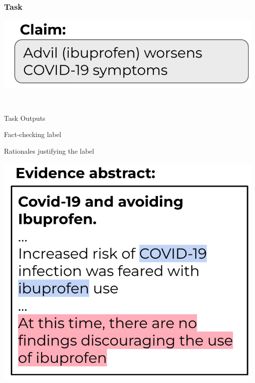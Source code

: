 \documentclass[13.5pt,aspecratio=169, xcolor=dvipsnames]{beamer}
\begin{document}


\begin{frame}
    \onehalfspacing
    \frametitle{Task}
    \begin{minipage}{0.47\textwidth}
        \includegraphics[width=\textwidth]{Claim.png}
         {
            \centering
            \begin{minipage}{0.7\textwidth}
            {
            \begin{block}{}
                \begin{center}
                    \textbf{\textcolor{white}{Label: Refuted}}
                \end{center}
            \end{block}
            }
            \end{minipage}     
        }
        
        \bigskip
         {
            \begin{flushleft}
            Task Outputs
            \begin{enumerate}
                \item Fact-checking label
                 {\item Rationales justifying the label}
            \end{enumerate}
            \end{flushleft}
        }

    \end{minipage}
    \begin{minipage}{0.45\textwidth}
        \includegraphics[width=1.2\textwidth]{Evidence_abstract.png}
        

\end{minipage}
\end{frame}
\end{document}
